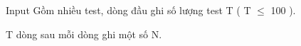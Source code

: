 Input
Gồm nhiều test, dòng đầu ghi số lượng test T ( T $\le$ 100 ).   


   T dòng sau mỗi dòng ghi một số N.